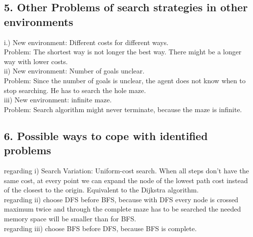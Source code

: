 \documentclass[10pt,a4paper]{article}
\begin{document}
	
			\subsection*{5. Other Problems of search strategies in other environments}


	i.) New environment: Different costs for different ways. \\
	 Problem: The shortest way is not longer the best way. There might be a longer way with lower costs. 
	\\
	ii) New environment: Number of goals unclear. \\
	Problem: Since the number of goals is unclear, the agent does not know when to stop searching. He has to search the hole maze. \\
	
	iii) New environment: infinite maze. \\
Problem: Search algorithm might never terminate, because the maze is infinite. \\
	
				\subsection*{6. Possible ways to cope with identified problems}
	regarding i) Search Variation: Uniform-cost search. When all steps don't have the same cost, at every point we can expand the node of the lowest path cost instead of the closest to the origin. Equivalent to the Dijkstra algorithm.
	\\
regarding ii) choose DFS before BFS, because with DFS every node is crossed maximum twice and through the complete maze has to be searched the needed memory space will be smaller than for BFS.
	\\
	regarding iii) choose BFS before DFS, because BFS is complete.
		
\end{document}
